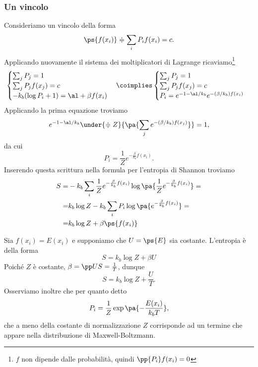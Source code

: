 \subsubsection{Un vincolo}
Consideriamo un vincolo della forma 
\[\ps{f(x_i)}\doteqdot\sum_i P_i f(x_i)=c.\]
Applicando nuovamente il sistema dei moltiplicatori di Lagrange ricaviamo\footnote{$f$ non dipende dalle probabilit\`a, quindi $\pp{P_i}f(x_i)=0$}
\[\begin{cases}
\sum_j P_j=1\\
\sum_j P_j f(x_j)=c\\
-k_b (\log P_i+1)=\al+\beta f(x_i)
\end{cases}\coimplies \begin{cases}
\sum_j P_j=1\\
\sum_j P_j f(x_j)=c\\
P_i=e^{-1-\al/k_b}e^{-(\beta/k_b) f(x_i)}
\end{cases}\]
Applicando la prima equazione troviamo
\[e^{-1-\al/k_b}\under{\doteqdot Z}{\pa{\sum_j e^{-(\beta/k_b)f(x_j)}}}=1,\]
da cui
\[P_i=\frac1Ze^{-\frac\beta{k_b}f(x_i)}.\]
Inserendo questa scrittura nella formula per l'entropia di Shannon troviamo
\begin{align*}
S=&-k_b\sum_i \frac1Ze^{-\frac\beta{k_b}f(x_i)}\log\pa{\frac1Ze^{-\frac\beta{k_b}f(x_i)}}=\\
=&k_b\log Z-k_b\sum_i P_i\log\pa{e^{-\frac\beta{k_b}f(x_i)}}=\\
=&k_b\log Z+\beta\ps{f(x_i)} 
\end{align*}

\begin{example}\label{EnergiaInternaCostante}
Sia $f(x_i)=E(x_i)$ e supponiamo che $U=\ps{E}$ sia costante. L'entropia \`e della forma
\[S=k_b\log Z+\beta U\]
Poich\'e $Z$ \`e costante, $\beta=\pp US=\frac1T$, dunque
\[S=k_b\log Z+\frac UT.\]
Osserviamo inoltre che per quanto detto
\[P_i=\frac1Z \exp\pa{-\dfrac{E(x_i)}{k_bT}},\]
che a meno della costante di normalizzazione $Z$ corrisponde ad un termine che appare nella distribuzione di Maxwell-Boltzmann.
\end{example}